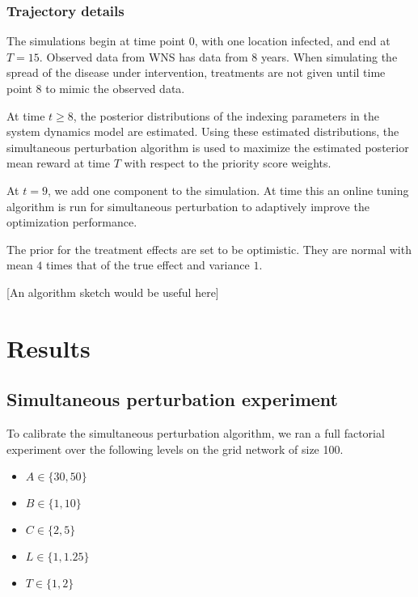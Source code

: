\documentclass[11pt]{article}
\begin{document}
\subsubsection{Trajectory details}
\label{sec-4-1-2}

The simulations begin at time point $0$, with one location infected,
and end at $T=15$.  Observed data from WNS has data from $8$ years.
When simulating the spread of the disease under intervention,
treatments are not given until time point $8$ to mimic the observed
data.

At time $t \ge 8$, the posterior distributions of the indexing
parameters in the system dynamics model are estimated.  Using these
estimated distributions, the simultaneous perturbation algorithm is
used to maximize the estimated posterior mean reward at time $T$
with respect to the priority score weights.

At $t = 9$, we add one component to the simulation.  At time this an
online tuning algorithm is run for simultaneous perturbation to
adaptively improve the optimization performance.

The prior for the treatment effects are set to be optimistic.  They
are normal with mean $4$ times that of the true effect and variance
$1$.

[An algorithm sketch would be useful here]


\section{Results}
\label{sec-5}

\subsection{Simultaneous perturbation experiment}
\label{sec-5-1}

To calibrate the simultaneous perturbation algorithm, we ran a full
factorial experiment over the following levels on the grid network
of size 100.
\begin{itemize}
  \item $A \in \lbrace 30, 50 \rbrace $
  \item $B \in \lbrace 1, 10 \rbrace $
  \item $C \in \lbrace 2, 5 \rbrace $
  \item $L \in \lbrace 1, 1.25 \rbrace $
  \item $T \in \lbrace 1, 2 \rbrace $
\end{itemize}
\end{document}
